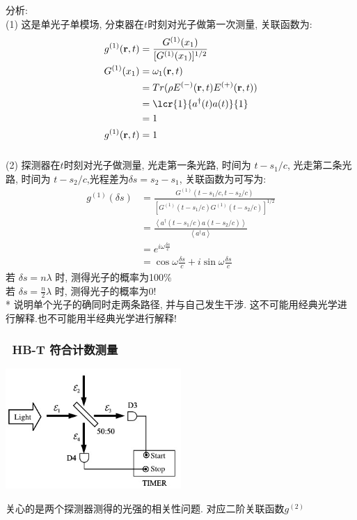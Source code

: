    \begin{frame} 
    \frametitle{}
    分析: \\ 
    (1) 这是单光子单模场, 分束器在$t$时刻对光子做第一次测量, 关联函数为:
    \[ \begin{aligned}
        g^{(1)} (\mathbf{r},t) &= \frac{G^{(1)}(x_1) }{[G^{(1)}(x_1)]^{1/2} } \\
        G^{(1)}(x_1) &= \omega_1(\mathbf{r}, t)  \\
        &= Tr( \rho E^{(-)}(\mathbf{r}, t)E^{(+)}(\mathbf{r}, t))\\ 
        &= \lcr{1}{a^{\dagger}(t)a(t)}{1}\\
        &=1\\ 
        g^{(1)} (\mathbf{r},t) &=1
    \end{aligned}\] 
   \end{frame}

   \begin{frame} 
    \frametitle{}
    (2) 探测器在$t$时刻对光子做测量, 光走第一条光路, 时间为 $t-s_1/c$, 光走第二条光路, 时间为 $t-s_2/c$,光程差为$\delta s = s_2-s_1$, 关联函数为可写为:
    \[ \begin{aligned}
        g^{(1)} (\delta s) &= \frac{G^{(1)}(t-s_1/c, t-s_2/c ) }{[G^{(1)}(t-s_1/c) G^{(1)}(t-s_2/c ) ]^{1/2} } \\
        &= \frac{\left\langle a^{\dagger}(t-s_1/c) a(t-s_2/c) \right\rangle}{\left\langle a^{\dagger} a \right\rangle}  \\
        &= e^{i \omega  \frac{\delta s}{c}} \\
        &= \cos{\omega  \frac{\delta s}{c}}+ i \sin {\omega  \frac{\delta s}{c}}
    \end{aligned}\] 
    若 $ \delta s= n\lambda $ 时, 测得光子的概率为100\% \\ 
    若 $ \delta s= \frac{n}{2}\lambda $ 时, 测得光子的概率为0! \\
    * 说明单个光子的确同时走两条路径, 并与自己发生干涉. 这不可能用经典光学进行解释.也不可能用半经典光学进行解释!
   \end{frame}

   \begin{frame}
    \frametitle{ HB-T 符合计数测量}
           \begin{center}
                \includegraphics[width=0.5\textwidth]{figs/2022-05-09-13-44-06.png}
           \end{center}
        关心的是两个探测器测得的光强的相关性问题. 对应二阶关联函数$g^{(2)}$
   \end{frame}

